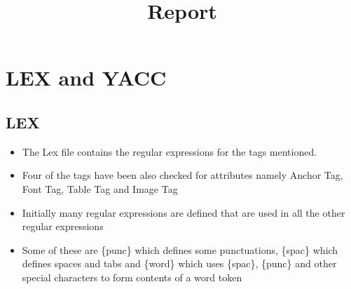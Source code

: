 \documentclass{article}
\title{Report}
\begin{document}
\maketitle

\section{LEX and YACC}

\subsection{LEX}
\begin{itemize}
\item The Lex file contains the regular expressions for the tags mentioned. 
\item Four of the tags have been also checked for attributes namely Anchor Tag, Font Tag, Table Tag and Image Tag
\item Initially many regular expressions are defined that are used in all the other regular expressions
\item Some of these are \{punc\} which defines some punctuations, \{spac\} which defines spaces and tabs and \{word\} which uses 
    			      \{spac\}, \{punc\} and other special characters to form contents of a word token
\end{itemize}
\end{document}
